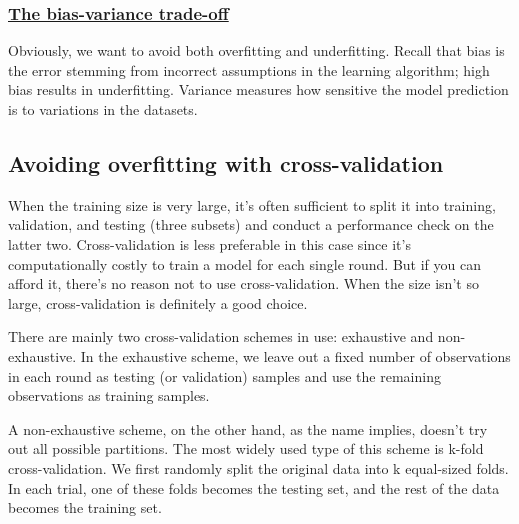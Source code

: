 \subsubsection*{\href{https://www.inf.ed.ac.uk/teaching/courses/mlsc/Notes/Lecture4/BiasVariance.pdf}{The bias-variance trade-off}}
Obviously, we want to avoid both overfitting and underfitting. Recall that bias is the error stemming from incorrect assumptions in the learning algorithm; high bias results in underfitting. Variance measures how sensitive the model prediction is to variations in the datasets.

\subsection{Avoiding overfitting with cross-validation}
\begin{tcolorbox}
    When the training size is very large, it's often sufficient to split it into training, validation, and testing (three subsets) and conduct a performance check on the latter two. Cross-validation is less preferable in this case since it's computationally costly to train a model for each single round. But if you can afford it, there's no reason not to use cross-validation. When the size isn't so large, cross-validation is definitely a good choice.
\end{tcolorbox}

There are mainly two cross-validation schemes in use: exhaustive and non-exhaustive. In the exhaustive scheme, we leave out a fixed number of observations in each round as testing (or validation) samples and use the remaining observations as training samples.

A non-exhaustive scheme, on the other hand, as the name implies, doesn't try out all possible partitions. The most widely used type of this scheme is k-fold cross-validation. We first randomly split the original data into k equal-sized folds. In each trial, one of these folds becomes the testing set, and the rest of the data becomes the training set.


